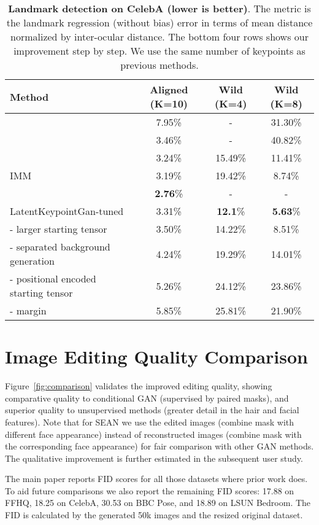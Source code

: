 \documentclass[10pt, conference, compsocconf]{IEEEtran}
\begin{document}
\begin{table*}[t]
\centering
\begin{tabular}{|l|c|c|c|}
\hline
Method & Aligned (K=10) & Wild (K=4) & Wild (K=8)  \\ \hline
\cite{thewlis2017unsupervised} & 7.95\% & - & 31.30\% \\ 
\cite{zhang2018unsupervised} & 3.46\% & - & 40.82\% \\ 
\cite{lorenz2019unsupervised} & 3.24\% & 15.49\% & 11.41\% \\
IMM \cite{jakab2018unsupervised} &  3.19\% & 19.42\% & 8.74\% \\
\cite{dundar2020unsupervised} &  \textbf{2.76}\% & - & - \\ \hline
LatentKeypointGan-tuned & 3.31\% & \textbf{12.1}\% & \textbf{5.63}\%\\ 
- larger starting tensor & 3.50\% & 14.22\% & 8.51\% \\
- separated background generation & 4.24\% & 19.29\% & 14.01\% \\
- positional encoded starting tensor & 5.26\% & 24.12\% & 23.86\% \\ 
- margin & 5.85\% & 25.81\% & 21.90\%
\\ \hline
\end{tabular}
\caption{\textbf{Landmark detection on CelebA (lower is better)}. The metric is the landmark regression (without bias) error in terms of mean  distance normalized by inter-ocular distance. The bottom four rows shows our improvement step by step. We use the same number of keypoints as previous methods.} 
\label{tab:supp_keypoint_detection}
\end{table*} \section{Image Editing Quality Comparison} \label{sec:supp_quality}
Figure~\ref{fig:comparison} validates the improved editing quality, showing comparative quality to conditional GAN (supervised by paired masks), and superior quality to unsupervised methods (greater detail in the hair and facial features). Note that for SEAN \cite{zhu2020sean} we use the edited images (combine mask with different face appearance) instead of reconstructed images (combine mask with the corresponding face appearance) for fair comparison with other GAN methods. The qualitative improvement is further estimated in the subsequent user study.

The main paper reports FID scores for all those datasets where prior work does. To aid future comparisons we also report the remaining FID scores: 17.88 on FFHQ, 18.25 on CelebA, 30.53 on BBC Pose, and 18.89 on LSUN Bedroom. The FID is calculated by the generated 50k images and the resized original dataset.
\end{document}
